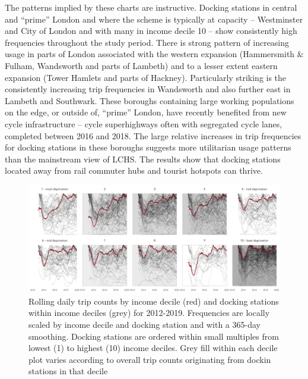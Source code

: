 \documentclass[
]{article}
\begin{document}
The patterns implied by these charts are instructive. Docking stations in central and ``prime'' London and where the scheme is typically at capacity -- Westminster and City of London and with many in income decile 10 -- show consistently high frequencies throughout the study period. There is strong pattern of increasing usage in parts of London associated with the western expansion (Hammersmith \& Fulham, Wandsworth and parts of Lambeth) and to a lesser extent eastern expansion (Tower Hamlets and parts of Hackney). Particularly striking is the consistently increasing trip frequencies in Wandsworth and also further east in Lambeth and Southwark. These boroughs containing large working populations on the edge, or outside of, ``prime'' London, have recently benefited from new cycle infrastructure -- cycle superhighways often with segregated cycle lanes, completed between 2016 and 2018.
The large relative increases in trip frequencies for docking stations in these boroughs suggests more utilitarian usage patterns than the mainstream view of LCHS.
The results show that docking stations located away from rail commuter hubs and tourist hotspots can thrive.

\begin{figure}

{\centering \includegraphics[width=1\linewidth]{figures/daily_hires_station_imd_minor} 

}

\caption{Rolling daily trip counts by income decile (red) and docking stations within income deciles (grey) for 2012-2019. Frequencies are locally scaled by income decile and docking station and with a 365-day smoothing. Docking stations are ordered within small multiples from lowest (1) to highest (10) income deciles. Grey fill within each decile plot varies according to overall trip counts originating from dockin stations in that decile}\label{fig:change-time-income}
\end{figure}
\end{document}
